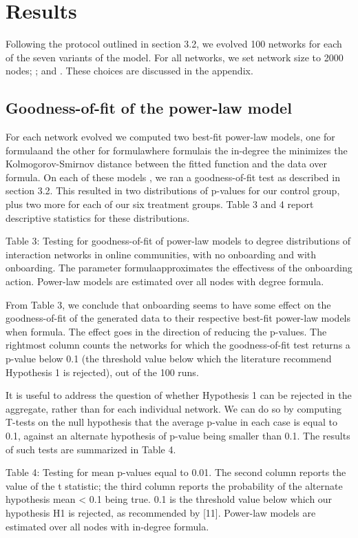 
\section{Results}
Following the protocol outlined in section 3.2, we evolved 100 networks for each of the seven variants of the model. For all networks, we set network size to 2000 nodes; ; and . These choices are discussed in the appendix.

\subsection{Goodness-of-fit of the power-law model}

For each network evolved we computed two best-fit power-law models, one for formulaand the other for formulawhere formulais the in-degree the minimizes the Kolmogorov-Smirnov distance between the fitted function and the data over formula. On each of these models , we ran a goodness-of-fit test as described in section 3.2. This resulted in two distributions of p-values for our control group, plus two more for each of our six treatment groups. Table 3 and 4 report descriptive statistics for these distributions.

Table 3: Testing for goodness-of-fit of power-law models to degree distributions of interaction networks in online communities, with no onboarding and with onboarding. The parameter formulaapproximates the effectivess of the onboarding action. Power-law models are estimated over all nodes with degree formula.

From Table 3, we conclude that onboarding seems to have some effect on the goodness-of-fit of the generated data to their respective best-fit power-law models when formula. The effect goes in the direction of reducing the p-values. The rightmost column counts the networks for which the goodness-of-fit test returns a p-value below 0.1 (the threshold value below which the literature recommend Hypothesis 1 is rejected), out of the 100 runs. 

It is useful to address the question of whether Hypothesis 1 can be rejected in the aggregate, rather than for each individual network. We can do so by computing T-tests on the null hypothesis that the average p-value in each case is equal to 0.1, against an alternate hypothesis of p-value being smaller than 0.1. The results of such tests are summarized in Table 4.

Table 4: Testing for mean p-values equal to 0.01. The second column reports the value of the t statistic; the third column reports the probability of the alternate hypothesis mean < 0.1 being true. 0.1 is the threshold value below which our hypothesis H1 is rejected, as recommended by [11]. Power-law models are estimated over all nodes with in-degree formula.

